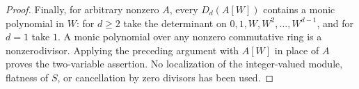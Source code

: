 \begin{proof}
Finally, for arbitrary nonzero $A$, every $D_d(A[W])$ contains a monic
polynomial in $W$: for $d\ge2$ take the determinant on
$0,1,W,W^2,\ldots,W^{d-1}$, and for $d=1$ take $1$.
A monic polynomial over any nonzero commutative ring is a
nonzerodivisor. Applying the preceding argument with $A[W]$ in place
of $A$ proves the two-variable assertion. No localization of the
integer-valued module, flatness of $S$, or cancellation by zero divisors
has been used.
\end{proof}
